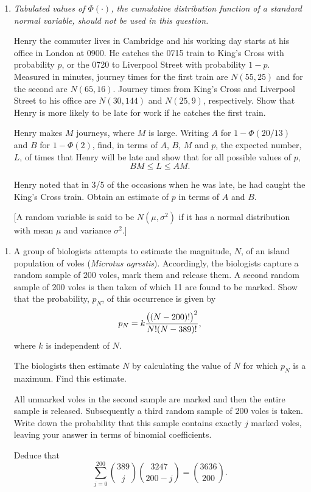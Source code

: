 \documentclass[a4, 11pt]{report}
\newlength{\qspace}
\newcounter{qnumber}
\newenvironment{question}%
 {\vspace{\qspace}
  \begin{enumerate}[\bfseries 1\quad][10]%
    \setcounter{enumi}{\value{qnumber}}%
    \item%
 }
{
  \end{enumerate}
  \filbreak
  \stepcounter{qnumber}
 }
\def\le{\leqslant}
\begin{document}
\begin{question}
{\it Tabulated values of ${\Phi}(\cdot)$,
the cumulative distribution function of a standard normal variable,
should not be used in this question.} 

 Henry the  commuter lives in Cambridge and his
working day starts at his office in London at 0900. He
 catches the 0715
train to King's Cross with probability $p$, or the 0720 to 
Liverpool Street with probability $1-p$.
 Measured in minutes, journey times for the first
train are $N(55,25)$ and for the second are $N(65,16)$. Journey times
from King's Cross and Liverpool Street to his office are $N(30,144)$ and
$N(25,9)$, respectively. Show that Henry is more likely
to be late for work if he catches the first train.
\par
Henry makes $M$ journeys, where $M$ is large.
Writing $A$ for $1-{\Phi}(20/13)$  and $B$ for $1-{\Phi}(2)$,  
find, in terms of $A$, $B$, $M$ and $p$,
the expected number, $L$,
of times that Henry will be late and show that for all possible
values of $p$,
$$
BM \le L \le AM.
$$ 

Henry noted that in 3/5 of the occasions when he was late,
he had caught the King's Cross train. Obtain an estimate of $p$
in terms of $A$ and $B$.

[A random variable is said to be $N\left({{\mu}, {\sigma}^2}\right)$
if it has a normal distribution with mean ${\mu}$ 
and variance ${\sigma}^2$.]

\end{question}

\begin{question}
A group of biologists attempts to estimate the magnitude, $N$, 
of an island population of voles ({\it Microtus agrestis}).   
Accordingly, the biologists  capture a random sample of 200 voles, mark them
and release them. A second random sample of 200 voles is then taken
of which 11 are found to be marked.  Show that the probability, $p_N$, of
this occurrence is given by
$$
p_N = k{{{\big((N-200)!\big)}^2}
\over
{N!(N-389)!}},
$$
where $k$ is independent of $N$.

The biologists  then estimate $N$ by calculating the value of
$N$ for which $p_N$ is a maximum. Find this estimate.

All unmarked voles in the second sample  
are marked and then the entire sample is released.
Subsequently a third random sample of 200
voles is taken. Write down the probability
that this sample contains exactly $j$ marked voles, leaving your 
answer in terms of binomial coefficients.

Deduce that 
$$
      \sum_{j=0}^{200}{389 \choose j}{3247 \choose {200-j}}
= {3636 \choose 200}.
$$
\end{question}
\end{document}
